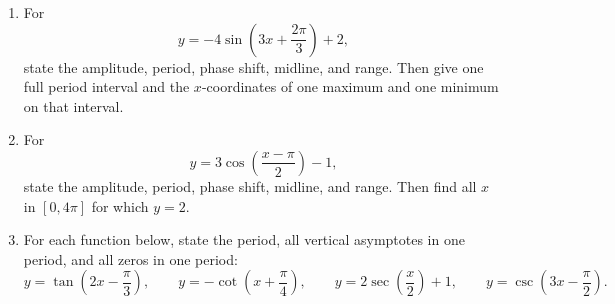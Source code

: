 \documentclass[12pt]{article}
\begin{document}
\begin{enumerate}[leftmargin=*, itemsep=1em, topsep=0.8em]
  \item For
  \[
  y=-4\sin\left(3x+\frac{2\pi}{3}\right)+2,
  \]
  state the amplitude, period, phase shift, midline, and range. Then give one full period interval and the $x$-coordinates of one maximum and one minimum on that interval.

  \item For
  \[
  y=3\cos\left(\frac{x-\pi}{2}\right)-1,
  \]
  state the amplitude, period, phase shift, midline, and range. Then find all $x$ in $[0,4\pi]$ for which $y=2$.

  \item For each function below, state the period, all vertical asymptotes in one period, and all zeros in one period:
  \[
  y=\tan\left(2x-\frac{\pi}{3}\right),\qquad
  y=-\cot\left(x+\frac{\pi}{4}\right),\qquad
  y=2\sec\left(\frac{x}{2}\right)+1,\qquad
  y=\csc\left(3x-\frac{\pi}{2}\right).
  \]
\end{enumerate}
\end{document}
